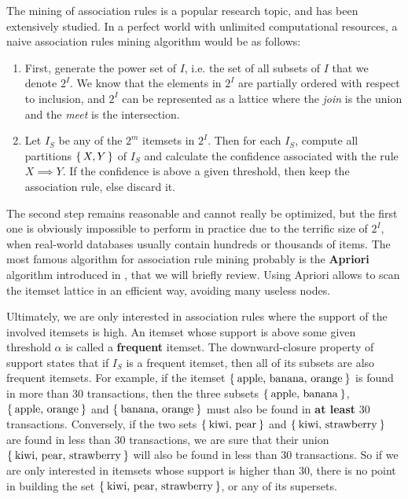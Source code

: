 The mining of association rules is a popular research topic, and has been
extensively studied. In a perfect world with unlimited computational resources,
a naive association rules mining algorithm would be as follows:
\begin{enumerate}
\item First, generate the power set of $I$, i.e. the set of all subsets of $I$
  that we denote $2^I$.  We know that the elements in $2^I$ are partially
  ordered with respect to inclusion, and $2^I$ can be represented as a lattice
    where the \textit{join} is the union and the \textit{meet} is the intersection.
\item Let $I_S$ be any of the $2^m$ itemsets in $2^I$. Then for each $I_S$,
  compute all partitions $\set{X, Y}$ of $I_S$ and calculate the confidence
    associated with the rule $X \implies Y$. If the confidence is above a given
    threshold, then keep the association rule, else discard it.
\end{enumerate}

The second step remains reasonable and cannot really be optimized, but the
first one is obviously impossible to perform in practice due to the terrific size of $2^I$,
when real-world databases usually contain hundreds or thousands of items.
The most famous algorithm for association rule mining probably is the
\textbf{Apriori} algorithm introduced in \cite{AgrSriVLDB94}, that we will
briefly review. Using Apriori allows to scan the itemset lattice in an
efficient way, avoiding many useless nodes.

Ultimately, we are only interested in association rules where the support of
the involved itemsets is high. An itemset whose support is above some given
threshold $\alpha$ is called a \textbf{frequent} itemset. The downward-closure
property of support states that if $I_S$ is a frequent itemset, then all of its
subsets are also frequent itemsets. For example, if the itemset
$\Set{\text{apple, banana, orange}}$ is found in more than 30 transactions,
then the three subsets $\Set{\text{apple, banana}}$, $\Set{\text{apple,
orange}}$ and $\Set{\text{banana, orange}}$ must also be found in \textbf{at
least} 30 transactions. Conversely, if the two sets $\Set{\text{kiwi, pear}}$ and
$\Set{\text{kiwi, strawberry}}$ are found in less than $30$ transactions, we
are sure that their union $\Set{\text{kiwi, pear, strawberry}}$ will also be
found in less than $30$ transactions. So if we are only interested in itemsets
whose support is higher than $30$, there is no point in building the set
$\Set{\text{kiwi, pear, strawberry}}$, or any of its supersets.

